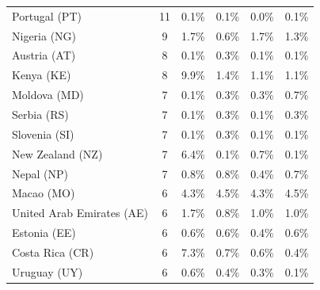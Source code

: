 {\begin{table}[ht]
{\begin{tabular}{lccccc}
Portugal (PT)         &    11  & \cellcolor{green0} 0.1\% & \cellcolor{green0} 0.1\% & \cellcolor{green0} 0.0\% & \cellcolor{green0} 0.1\% \\  %
Nigeria (NG)          &     9  & 1.7\% & \cellcolor{green1} 0.6\% & 1.7\% & \cellcolor{green0} 1.3\% \\  %
Austria (AT)          &     8  & 0.1\% & \cellcolor{red2} 0.3\% & 0.1\% & 0.1\% \\  %
Kenya (KE)            &     8  & \cellcolor{red5}  9.9\% & \cellcolor{green0} 1.4\% & \cellcolor{green0} 1.1\% & \cellcolor{green0} 1.1\% \\  %
Moldova (MD)          &     7  & \cellcolor{green1} 0.1\% & \cellcolor{green1} 0.3\% & \cellcolor{green1} 0.3\% & \cellcolor{green1} 0.7\% \\  %
Serbia (RS)           &     7  & 0.1\% & \cellcolor{red1} 0.3\% & 0.1\% & \cellcolor{red1} 0.3\% \\  %
Slovenia (SI)         &     7  & \cellcolor{green0} 0.1\% & \cellcolor{green0} 0.3\% & \cellcolor{green0} 0.1\% & \cellcolor{green0} 0.1\% \\  %
New Zealand (NZ)      &     7  & \cellcolor{red5}  6.4\% & \cellcolor{green0} 0.1\% & 0.7\% & \cellcolor{green0} 0.1\% \\  %
Nepal (NP)            &     7  & 0.8\% & 0.8\% & \cellcolor{green1} 0.4\% & \cellcolor{green0} 0.7\% \\  %
Macao (MO)            &     6  & \cellcolor{green2} 4.3\% & 4.5\% & \cellcolor{green2} 4.3\% & 4.5\% \\  %
United Arab Emirates (AE)  &     6  & \cellcolor{red5}  1.7\% & \cellcolor{green1} 0.8\% & \cellcolor{green0} 1.0\% & \cellcolor{green0} 1.0\% \\  %
Estonia (EE)          &     6  & 0.6\% & 0.6\% & 0.4\% & 0.6\% \\  %
Costa Rica (CR)       &     6  & \cellcolor{red1} 7.3\% & \cellcolor{green0} 0.7\% & \cellcolor{green1} 0.6\% & \cellcolor{green1} 0.4\% \\  %
Uruguay (UY)          &     6  & \cellcolor{red1} 0.6\% & 0.4\% & \cellcolor{green0} 0.3\% & \cellcolor{green1} 0.1\% \\  %

\end{tabular}}
\end{table}}
